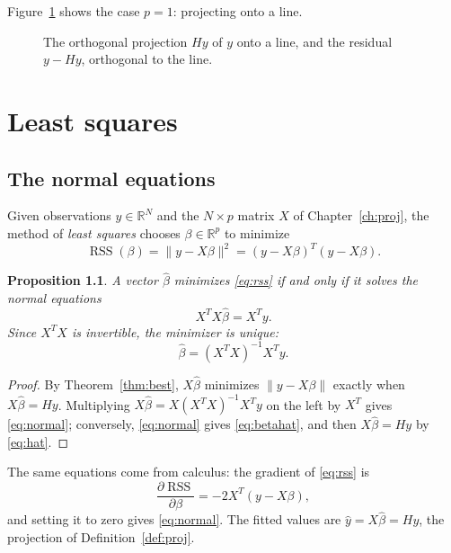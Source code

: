 \documentclass[11pt,oneside,openany]{book}
\newtheorem{proposition}[theorem]{Proposition}
\theoremstyle{definition}
\numberwithin{equation}{chapter}
\DeclareMathOperator{\col}{col}
\begin{document}
Figure~\ref{fig:proj} shows the case $p = 1$: projecting onto a line.
\begin{figure}[h]
\centering
{}
\caption{The orthogonal projection $Hy$ of $y$ onto a line, and the residual $y - Hy$, orthogonal to the line.}\label{fig:proj}
\end{figure}

\chapter{Least squares}\label{ch:ls}
\section{The normal equations}
Given observations $y \in \mathbb{R}^N$ and the $N \times p$ matrix $X$ of Chapter~\ref{ch:proj}, the method of
\emph{least squares} \citep{legendre1805, gauss1809} chooses $\beta \in \mathbb{R}^p$ to minimize
\begin{equation}\label{eq:rss}
\operatorname{RSS}(\beta) = \|y - X\beta\|^2 = (y - X\beta)^T (y - X\beta).
\end{equation}
\begin{proposition}\label{prop:normal}
A vector $\hat\beta$ minimizes \eqref{eq:rss} if and only if it solves the \emph{normal equations}
\begin{equation}\label{eq:normal}
X^T X \hat\beta = X^T y .
\end{equation}
Since $X^T X$ is invertible, the minimizer is unique:
\begin{equation}\label{eq:betahat}
\hat\beta = (X^T X)^{-1} X^T y .
\end{equation}
\end{proposition}
\begin{proof}
By Theorem~\ref{thm:best}, $X\hat\beta$ minimizes $\|y - X\beta\|$ exactly when $X\hat\beta = Hy$.
Multiplying $X \hat\beta = X (X^TX)^{-1} X^T y$ on the left by $X^T$ gives \eqref{eq:normal};
conversely, \eqref{eq:normal} gives \eqref{eq:betahat}, and then $X\hat\beta = Hy$ by \eqref{eq:hat}.
\end{proof}
The same equations come from calculus: the gradient of \eqref{eq:rss} is
\begin{equation}\label{eq:gradient}
\frac{\partial \operatorname{RSS}}{\partial \beta} = -2 X^T (y - X\beta),
\end{equation}
and setting it to zero gives \eqref{eq:normal}. The fitted values are $\hat y = X \hat\beta = H y$, the
projection of Definition~\ref{def:proj}.
\end{document}

